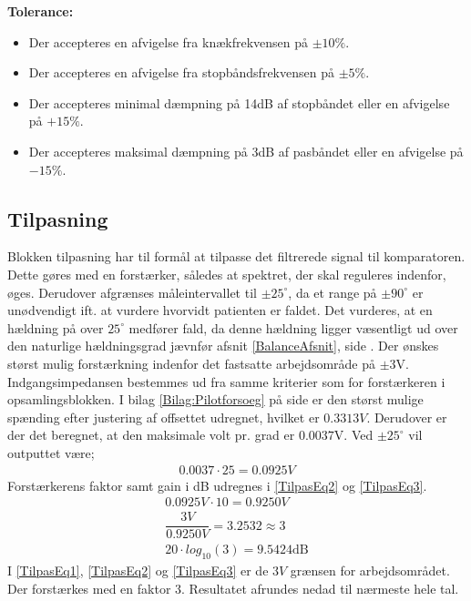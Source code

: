 \textbf{Tolerance:}
\begin{itemize}
	\item Der accepteres en afvigelse fra knækfrekvensen på $\pm10\%$.
	\item Der accepteres en afvigelse fra stopbåndsfrekvensen på $\pm5\%$.
	\item Der accepteres minimal dæmpning på 14dB af stopbåndet eller en afvigelse på $+15\%$.
	\item Der accepteres maksimal dæmpning på 3dB af pasbåndet eller en afvigelse på $-15\%$.
\end{itemize}
\subsection{Tilpasning}\label{Tilpasningsblok}
Blokken tilpasning har til formål at tilpasse det filtrerede signal til komparatoren. Dette gøres med en forstærker, således at spektret, der skal reguleres indenfor, øges. Derudover afgrænses måleintervallet til $\pm25^{\circ}$, da et range på $\pm90^{\circ}$ er unødvendigt ift. at vurdere hvorvidt patienten er faldet. Det vurderes, at en hældning på over $25^{\circ}$ medfører fald, da denne hældning ligger væsentligt ud over den naturlige hældningsgrad jævnfør afsnit \ref{BalanceAfsnit}, side \pageref{BalanceAfsnit}. Der ønskes størst mulig forstærkning indenfor det fastsatte arbejdsområde på $\pm3$V. Indgangsimpedansen bestemmes ud fra samme kriterier som for forstærkeren i opsamlingsblokken. I bilag \ref{Bilag:Pilotforsoeg} på side \pageref{Bilag:Pilotforsoeg} er den størst mulige spænding efter justering af offsettet udregnet, hvilket er $0.3313V$. Derudover er der det beregnet, at den maksimale volt pr. grad er $0.0037$V. Ved $\pm25^{\circ}$ vil outputtet være;
\begin{align}
\label{Udreg3} 0.0037 \cdot 25 = 0.0925V
\end{align}
Forstærkerens faktor samt gain i dB udregnes i \eqref{TilpasEq2} og \eqref{TilpasEq3}.
\begin{align}
\label{TilpasEq1} 0.0925V \cdot 10 = 0.9250V \\
\label{TilpasEq2} \dfrac{3V}{0.9250V} = 3.2532 \approx 3 \\
\label{TilpasEq3} 20 \cdot log_{10} (3) = 9.5424\text{dB}
\end{align} 
I \eqref{TilpasEq1}, \eqref{TilpasEq2} og \eqref{TilpasEq3} er de $3V$ grænsen for arbejdsområdet. Der forstærkes med en faktor 3. Resultatet afrundes nedad til nærmeste hele tal. \\

